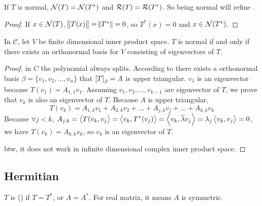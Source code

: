 \begin{theorem}
    If $T$ is normal, $\mathcal{N}(T) = \mathcal{N}(T^*)$ and $\mathcal{R}(T) = \mathcal{R}(T^*)$. So being normal will refine .
\end{theorem}
\begin{proof}
    If $x \in \mathcal{N}(T)$, $\norm{T(x)} = \norm{T^*} = 0$, so $T^*(x) = 0$ and $x \in \mathcal{N}(T^*)$.
\end{proof}



\begin{theorem}
    In $\mathcal{C}$, let $V$ be finite dimensional inner product space. $T$ is normal if and only if there exists an orthonormal basis for $V$ consisting of eigenvectors of $T$.
\end{theorem}
\begin{proof}
    in $C$ the polynomial always splits. According to  there exists a orthonormal basis $\beta = \{v_1, v_2, \dots, v_n\}$ that $\coordinate{T}_\beta = A$ is upper triangular. $v_1$ is an eigenvector because $T(v_1)=A_{1,1} v_1$. Assuming $v_1, v_2, \dots, v_{k-1}$ are eigenvector of $T$, we prove that $v_k$ is also an eigenvector of $T$. Because $A$ is upper triangular, 
    \begin{equation*}
        T(v_k) = A_{1,k} v_1 + A_{2,k} v_2 + \dots + A_{j,k} v_j + \dots + A_{k,k} v_k
    \end{equation*}
    Because $\forall j < k$, $A_{j,k} = \left\langle \displaystyle T(v_k, v_j \right\rangle = \left\langle \displaystyle v_k, T^*(v_j) \right\rangle = \left\langle \displaystyle v_k, \overline{\lambda} v_j \right\rangle = \lambda_j \left\langle \displaystyle v_k, v_j \right\rangle = 0$, we have $T(v_k) = A_{k,k} v_k$, so $v_k$ is an eigenvector of $T$.
    
    btw, it does not work in infinite dimensional complex inner product space.
\end{proof}






\subsection{Hermitian}

\begin{definition}
    $T$ is  () if $T = T^*$, or $A = A^*$. For real matrix, it means $A$ is symmetric.
\end{definition}

